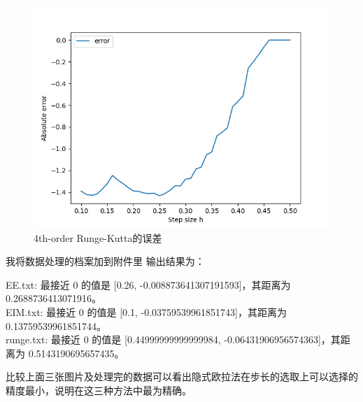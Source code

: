 \documentclass[12pt, a4paper, oneside]{ctexart}
\begin{document}
\begin{spacing}{2.0}
\begin{figure}[H]
      \begin{minipage}[t]{0.5\linewidth}
        \centering
        \includegraphics[scale=0.3]{Runge_Kutta4 ddd.png}
        \caption{4th-order Runge-Kutta的误差}
        \label{fig:side:b}
      \end{minipage}
\end{figure}

我将数据处理的档案加到附件里
输出结果为：
\begin{center}
    EE.txt: 最接近 0 的值是 [0.26, -0.008873641307191593]，其距离为 0.2688736413071916。\\
    EIM.txt: 最接近 0 的值是 [0.1, -0.03759539961851743]，其距离为 0.13759539961851744。\\
    runge.txt: 最接近 0 的值是 [0.44999999999999984, -0.06431906956574363]，其距离为 0.5143190695657435。
\end{center}
比较上面三张图片及处理完的数据可以看出隐式欧拉法在步长的选取上可以选择的精度最小，说明在这三种方法中最为精确。

\end{spacing}{}
\end{document}
